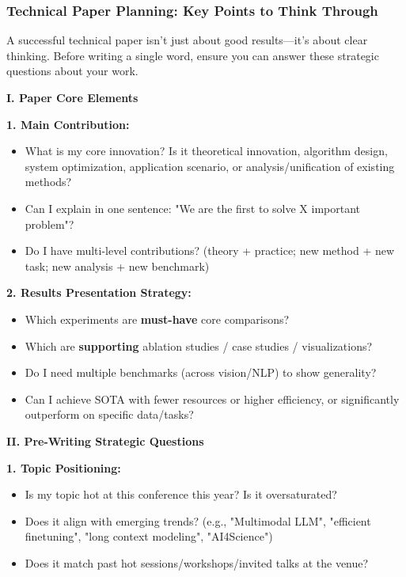 \documentclass[11pt,a4paper]{article}
\begin{document}
\subsubsection{Technical Paper Planning: Key Points to Think Through}

\begin{tcolorbox}[colback=blue!5,colframe=darkblue,title=Before You Start Writing a Technical Paper]
A successful technical paper isn't just about good results—it's about clear thinking. Before writing a single word, ensure you can answer these strategic questions about your work.
\end{tcolorbox}

\textbf{I. Paper Core Elements}

\textbf{1. Main Contribution:}
\begin{itemize}
    \item What is my core innovation? Is it theoretical innovation, algorithm design, system optimization, application scenario, or analysis/unification of existing methods?
    \item Can I explain in one sentence: "We are the first to solve X important problem"?
    \item Do I have multi-level contributions? (theory + practice; new method + new task; new analysis + new benchmark)
\end{itemize}

\textbf{2. Results Presentation Strategy:}
\begin{itemize}
    \item Which experiments are \textbf{must-have} core comparisons?
    \item Which are \textbf{supporting} ablation studies / case studies / visualizations?
    \item Do I need multiple benchmarks (across vision/NLP) to show generality?
    \item Can I achieve SOTA with fewer resources or higher efficiency, or significantly outperform on specific data/tasks?
\end{itemize}

\textbf{II. Pre-Writing Strategic Questions}

\textbf{1. Topic Positioning:}
\begin{itemize}
    \item Is my topic hot at this conference this year? Is it oversaturated?
    \item Does it align with emerging trends? (e.g., "Multimodal LLM", "efficient finetuning", "long context modeling", "AI4Science")
    \item Does it match past hot sessions/workshops/invited talks at the venue?
\end{itemize}
\end{document}
